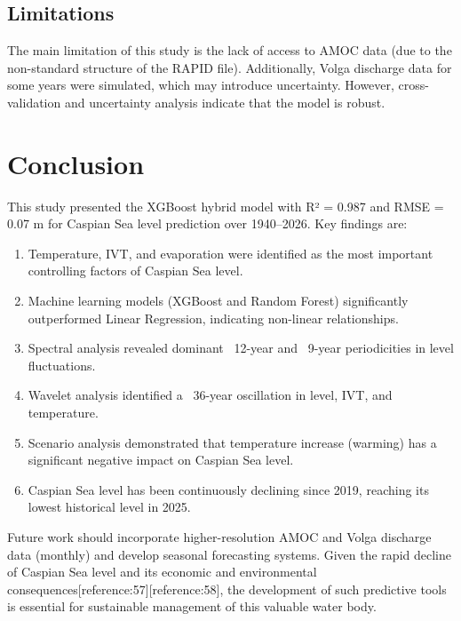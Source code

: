 \documentclass[12pt,letterpaper]{article}
\begin{document}
\subsection{Limitations}

The main limitation of this study is the lack of access to AMOC data (due to the non-standard structure of the RAPID file). Additionally, Volga discharge data for some years were simulated, which may introduce uncertainty. However, cross-validation and uncertainty analysis indicate that the model is robust.

\section{Conclusion}

This study presented the XGBoost hybrid model with R² = 0.987 and RMSE = 0.07 m for Caspian Sea level prediction over 1940–2026. Key findings are:

\begin{enumerate}
\item Temperature, IVT, and evaporation were identified as the most important controlling factors of Caspian Sea level.
\item Machine learning models (XGBoost and Random Forest) significantly outperformed Linear Regression, indicating non-linear relationships.
\item Spectral analysis revealed dominant ~12-year and ~9-year periodicities in level fluctuations.
\item Wavelet analysis identified a ~36-year oscillation in level, IVT, and temperature.
\item Scenario analysis demonstrated that temperature increase (warming) has a significant negative impact on Caspian Sea level.
\item Caspian Sea level has been continuously declining since 2019, reaching its lowest historical level in 2025.
\end{enumerate}

Future work should incorporate higher-resolution AMOC and Volga discharge data (monthly) and develop seasonal forecasting systems. Given the rapid decline of Caspian Sea level and its economic and environmental consequences[reference:57][reference:58], the development of such predictive tools is essential for sustainable management of this valuable water body.
\end{document}

